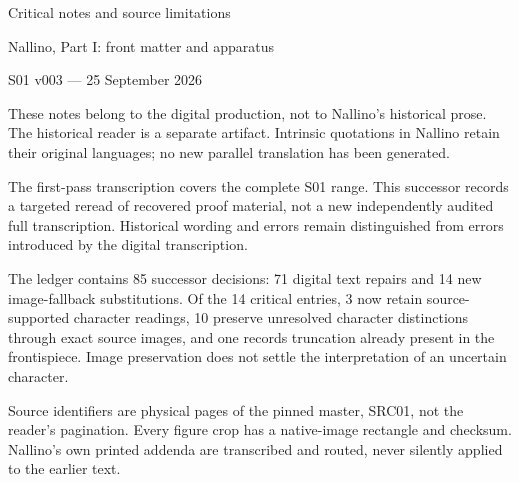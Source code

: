 \documentclass[11pt]{article}
\begin{document}
\begin{center}{\Large Critical notes and source limitations}\par
{\large Nallino, Part I: front matter and apparatus}\par
S01 v003 — 25 September 2026\end{center}
These notes belong to the digital production, not to Nallino's historical prose. The historical reader is a separate artifact. Intrinsic quotations in Nallino retain their original languages; no new parallel translation has been generated.

The first-pass transcription covers the complete S01 range. This successor records a targeted reread of recovered proof material, not a new independently audited full transcription. Historical wording and errors remain distinguished from errors introduced by the digital transcription.

The ledger contains 85 successor decisions: 71 digital text repairs and 14 new image-fallback substitutions. Of the 14 critical entries, 3 now retain source-supported character readings, 10 preserve unresolved character distinctions through exact source images, and one records truncation already present in the frontispiece. Image preservation does not settle the interpretation of an uncertain character.

Source identifiers are physical pages of the pinned master, SRC01, not the reader's pagination. Every figure crop has a native-image rectangle and checksum. Nallino's own printed addenda are transcribed and routed, never silently applied to the earlier text.
\end{document}
